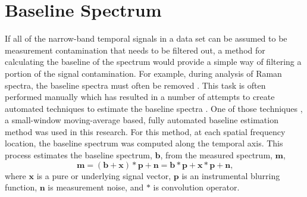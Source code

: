 \section{Baseline Spectrum}
\label{chap:06_baseline}
If all of the narrow-band temporal signals in a data set can be assumed to be measurement contamination that needs to be filtered out, a method for calculating the baseline of the spectrum would provide a simple way of filtering a portion of the signal contamination.
For example, during analysis of Raman spectra, the baseline spectra must often be removed \cite{Schulze-2012-GmyAqzC7}.
This task is often performed manually which has resulted in a number of attempts to create automated techniques to estimate the baseline spectra \cite{Mosier-Boss-1995-keK3ckUN, Schulze-2005-QkUeywxD, Schulze-2012-GmyAqzC7, Zhao-2007-HAc6j8Wb}.
One of those techniques \cite{Schulze-2012-GmyAqzC7}, a small-window moving-average based, fully automated baseline estimation method was used in this research.
For this method, at each spatial frequency location, the baseline spectrum was computed along the temporal axis.
This process estimates the baseline spectrum, $\mathbf{b}$, from the measured spectrum, $\mathbf{m}$,
\begin{equation}
  \mathbf{m} = (\mathbf{b}+\mathbf{x})*\mathbf{p}+\mathbf{n} = \mathbf{b}*\mathbf{p}+\mathbf{x}*\mathbf{p}+\mathbf{n} \textrm{,}
\end{equation}
where $\mathbf{x}$ is a pure or underlying signal vector, $\mathbf{p}$ is an instrumental blurring function, $\mathbf{n}$ is measurement noise, and $*$ is convolution operator.

